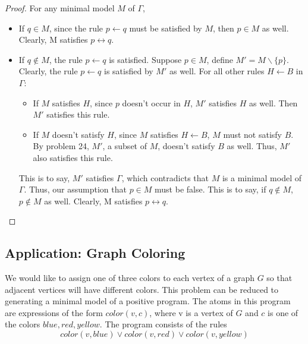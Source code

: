 \begin{proof}
For any minimal model $M$ of $\Gamma$, 
\begin{itemize}
   \item If $q \in M$, since the rule $p \leftarrow q$ must be satisfied by $M$, then $p \in M$ as well. Clearly, M satisfies $p \leftrightarrow q$.  
   \item If $q \not \in M$, the rule $p \leftarrow q$ is satisfied. Suppose $p \in M$, define $M' = M \backslash \{p\}$. Clearly, the rule $p \leftarrow q$ is satisfied by $M'$ as well. For all other rules $H \leftarrow B$ in $\Gamma$:
   \begin{itemize}
       \item If $M$ satisfies $H$, since $p$ doesn't occur in $H$, $M'$ satisfies $H$ as well. Then $M'$ satisfies this rule. 
       \item If $M$ doesn't satisfy $H$, since $M$ satisfies $H \leftarrow B$, $M$ must not satisfy $B$. By problem 24, $M'$, a subset of $M$, doesn't satisfy $B$ as well. Thus, $M'$ also satisfies this rule. 
   \end{itemize}
   This is to say, $M'$ satisfies $\Gamma$, which contradicts that $M$ is a minimal model of $\Gamma$. Thus, our assumption that $p \in M$ must be false. This is to say, if $q \not \in M$, $p \not \in M$ as well. Clearly, M satisfies $p \leftrightarrow q$. 
\end{itemize}

\end{proof}


\subsection{Application: Graph Coloring}
We would like to assign one of three colors to each vertex of a graph $G$ so that adjacent vertices will have different colors. This problem can be reduced to generating a minimal model of a positive program. The atoms in this program are expressions of the form $color(v,c)$, where v is a vertex of $G$ and $c$ is one of the colors $blue, red, yellow$. The program consists of the rules
\begin{equation}
    color(v, blue) \vee color(v, red) \vee color(v, yellow)
    \label{rule2}
\end{equation}

